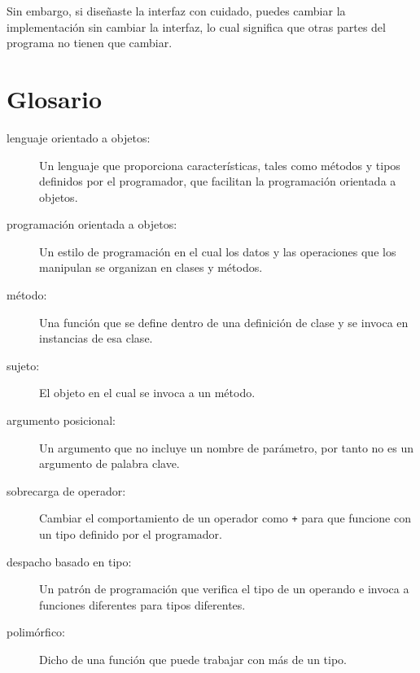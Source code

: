 \documentclass[10pt]{book}
\begin{document}
Sin embargo, si diseñaste la interfaz con cuidado, puedes
cambiar la implementación sin cambiar la interfaz, lo cual
significa que otras partes del programa no tienen que cambiar.


\section{Glosario}

\begin{description}

\item[lenguaje orientado a objetos:] Un lenguaje que proporciona características,
  tales como métodos y tipos definidos por el programador, que facilitan
  la programación orientada a objetos.

\item[programación orientada a objetos:] Un estilo de programación en el cual
los datos y las operaciones que los manipulan se organizan en clases
y métodos.

\item[método:] Una función que se define dentro de una definición de clase y
se invoca en instancias de esa clase.

\item[sujeto:] El objeto en el cual se invoca a un método.

\item[argumento posicional:]  Un argumento que no incluye
un nombre de parámetro, por tanto no es un argumento de palabra clave.

\item[sobrecarga de operador:] Cambiar el comportamiento de un operador como
{\tt +} para que funcione con un tipo definido por el programador.

\item[despacho basado en tipo:] Un patrón de programación que verifica el tipo
de un operando e invoca a funciones diferentes para tipos diferentes.
 

\item[polimórfico:] Dicho de una función que puede trabajar con más de
  un tipo.

\end{description}
\end{document}
